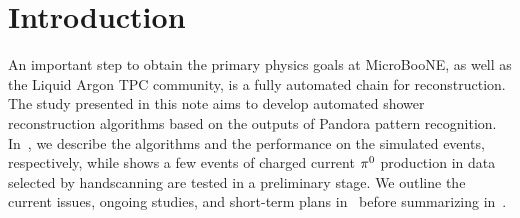 \section{Introduction}
\label{sec:intro}

An important step to obtain the primary physics goals at MicroBooNE,
as well as the Liquid Argon TPC community, is a fully
automated chain for reconstruction.
The study presented in this note aims to develop automated
shower reconstruction algorithms based on the outputs of Pandora 
pattern recognition.
In~, we describe the algorithms and the
performance on the simulated events, respectively,
while  shows a few events of charged current ${\pi}^0$
production in data selected by handscanning
are tested in a preliminary stage.
We outline the current issues, ongoing studies, and short-term
plans in~ before summarizing in~.\\
